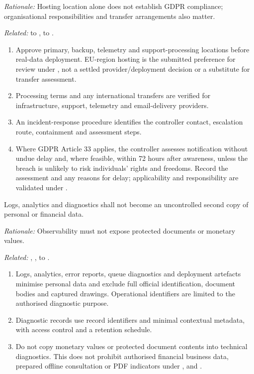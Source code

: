 \textit{Rationale:} Hosting location alone does not establish GDPR compliance; organisational responsibilities and transfer arrangements also matter.

\textit{Related:} \hyperref[fr:001]{} to \hyperref[fr:008]{}, \hyperref[fr:038]{} to \hyperref[fr:045]{}.
\begin{enumerate}[label=(\alph*),leftmargin=*,itemsep=1pt,topsep=3pt]
\item Approve primary, backup, telemetry and support-processing locations before real-data deployment. EU-region hosting is the submitted preference for review under , not a settled provider/deployment decision or a substitute for transfer assessment.
\item Processing terms and any international transfers are verified for infrastructure, support, telemetry and email-delivery providers.
\item An incident-response procedure identifies the controller contact, escalation route, containment and assessment steps.
\item Where GDPR Article 33 applies, the controller assesses notification without undue delay and, where feasible, within 72 hours after awareness, unless the breach is unlikely to risk individuals' rights and freedoms. Record the assessment and any reasons for delay; applicability and responsibility are validated under .
\end{enumerate}

\label{nfr:PRV-06}
Logs, analytics and diagnostics shall not become an uncontrolled second copy of personal or financial data.

\textit{Rationale:} Observability must not expose protected documents or monetary values.

\textit{Related:} \hyperref[fr:038]{}, \hyperref[fr:045]{}, \hyperref[fr:053]{} to \hyperref[fr:062]{}.
\begin{enumerate}[label=(\alph*),leftmargin=*,itemsep=1pt,topsep=3pt]
\item Logs, analytics, error reports, queue diagnostics and deployment artefacts minimise personal data and exclude full official identification, document bodies and captured drawings. Operational identifiers are limited to the authorised diagnostic purpose.
\item Diagnostic records use record identifiers and minimal contextual metadata, with access control and a retention schedule.
\item Do not copy monetary values or protected document contents into technical diagnostics. This does not prohibit authorised financial business data, prepared offline consultation or PDF indicators under \hyperref[fr:053]{}, \hyperref[fr:060]{} and \hyperref[fr:062]{}.
\end{enumerate}

